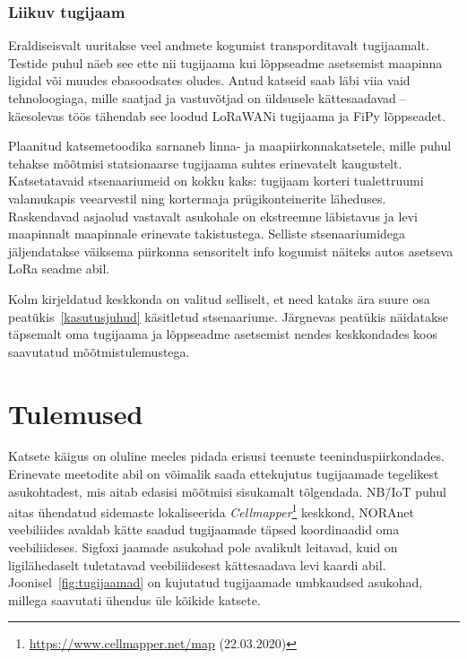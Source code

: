 \documentclass[12pt]{article}
\begin{document}
    \subsubsection{Liikuv tugijaam}

    Eraldiseisvalt uuritakse veel andmete kogumist transporditavalt tugijaamalt.
    Testide puhul näeb see ette nii tugijaama kui lõppseadme asetsemist maapinna ligidal või muudes ebasoodsates oludes.
    Antud katseid saab läbi viia vaid tehnoloogiaga, mille saatjad ja vastuvõtjad on üldsusele kättesaadavad -- käesolevas töös tähendab see loodud LoRaWANi tugijaama ja FiPy lõppseadet.

    Plaanitud katsemetoodika sarnaneb linna- ja maapiirkonnakatsetele, mille puhul tehakse mõõtmisi statsionaarse tugijaama suhtes erinevatelt kaugustelt.
    Katsetatavaid stsenaariumeid on kokku kaks: tugijaam korteri tualettruumi valamukapis veearvestil ning kortermaja prügikonteinerite läheduses.
    Raskendavad asjaolud vastavalt asukohale on ekstreemne läbistavus ja levi maapinnalt maapinnale erinevate takistustega.
    Selliste stsenaariumidega jäljendatakse väiksema piirkonna sensoritelt info kogumist näiteks autos asetseva LoRa seadme abil.

    Kolm kirjeldatud keskkonda on valitud selliselt, et need kataks ära suure osa peatükis~\ref{kasutusjuhud} käsitletud stsenaariume.
    Järgnevas peatükis näidatakse täpsemalt oma tugijaama ja lõppseadme asetsemist nendes keskkondades koos saavutatud mõõtmistulemustega.

    \newpage

    \section{Tulemused}

    Katsete käigus on oluline meeles pidada erisusi teenuste teeninduspiirkondades.
    Erinevate meetodite abil on võimalik saada ettekujutus tugijaamade tegelikest asukohtadest, mis aitab edasisi mõõtmisi sisukamalt tõlgendada.
    NB\=/IoT puhul aitas ühendatud sidemaste lokaliseerida \textit{Cellmapper}\footnote{\url{https://www.cellmapper.net/map} (22.03.2020)} keskkond, NORAnet veebiliides avaldab kätte saadud tugijaamade täpsed koordinaadid oma veebiliideses.
    Sigfoxi jaamade asukohad pole avalikult leitavad, kuid on ligilähedaselt tuletatavad veebiliidesest kättesaadava levi kaardi abil.
    Joonisel~\ref{fig:tugijaamad} on kujutatud tugijaamade umbkaudsed asukohad, millega saavutati ühendus üle kõikide katsete.
\end{document}
